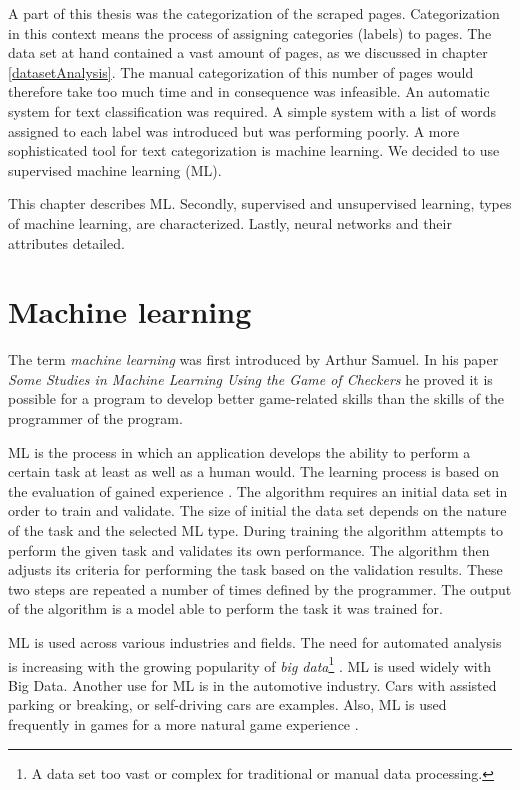 \label{machineLearning}
A part of this thesis was the categorization of the scraped pages. Categorization in this context means the process of assigning categories (labels) to pages. The data set at hand contained a vast amount of pages, as we discussed in chapter \ref{datasetAnalysis}. The manual categorization of this number of pages would therefore take too much time and in consequence was infeasible. An automatic system for text classification was required. A simple system with a list of words assigned to each label was introduced but was performing poorly. A more sophisticated tool for text categorization is machine learning. We decided to use supervised machine learning (ML).

This chapter describes ML. Secondly, supervised and unsupervised learning, types of machine learning, are characterized. Lastly, neural networks and their attributes detailed.
 
\section{Machine learning} \label{machineLearning}
The term \textit{machine learning} was first introduced by Arthur Samuel. In his paper \textit{Some Studies in Machine Learning Using the Game of Checkers} \cite{machineLearningOriginal} he proved it is possible for a program to develop better game-related skills than the skills of the programmer of the program.

ML is the process in which an application develops the ability to perform a certain task at least as well as a human would. The learning process is based on the evaluation of gained experience \cite{machineLearningToday}. The algorithm requires an initial data set in order to train and validate. The size of initial the data set depends on the nature of the task and the selected ML type. During training the algorithm attempts to perform the given task and validates its own performance. The algorithm then adjusts its criteria for performing the task based on the validation results. These two steps are repeated a number of times defined by the programmer. The output of the algorithm is a model able to perform the task it was trained for. 

ML is used across various industries and fields. The need for automated analysis is increasing with the growing popularity of \textit{big data}\footnote{A data set too vast or complex for traditional or manual data processing.} \cite{bigDataExplained} \cite{bigDataPopularity}. ML is used widely with Big Data. Another use for ML is in the automotive industry. Cars with assisted parking or breaking, or self-driving cars are examples\cite{selfDrivingCars}. Also, ML is used frequently in games for a more natural game experience \cite{machineLearningGaming}. 

